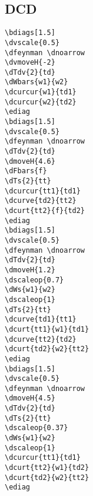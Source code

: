 \documentclass[a4paper]{article}
\begin{document}
\subsection{DCD}
\begin{minipage}[b]{0.55\linewidth}\centering
\begin{lstlisting}
\bdiags[1.5]
\dvscale{0.5}
\dfeynman \dnoarrow
\dvmoveH{-2}
\dTdv{2}{td}
\dWbars{w1}{w2}
\dcurcur{w1}{td1}
\dcurcur{w2}{td2}
\ediag
\bdiags[1.5]
\dvscale{0.5}
\dfeynman \dnoarrow
\dTdv{2}{td}
\dmoveH{4.6}
\dFbars{f}
\dTs{2}{tt}
\dcurcur{tt1}{td1}
\dcurve{td2}{tt2}
\dcurt{tt2}{f}{td2}
\ediag
\bdiags[1.5]
\dvscale{0.5}
\dfeynman \dnoarrow
\dTdv{2}{td}
\dmoveH{1.2}
\dscaleop{0.7}
\dWs{w1}{w2}
\dscaleop{1}
\dTs{2}{tt}
\dcurve{td1}{tt1}
\dcurt{tt1}{w1}{td1}
\dcurve{tt2}{td2}
\dcurt{td2}{w2}{tt2}
\ediag
\bdiags[1.5]
\dvscale{0.5}
\dfeynman \dnoarrow
\dmoveH{4.5}
\dTdv{2}{td}
\dTs{2}{tt}
\dscaleop{0.37}
\dWs{w1}{w2}
\dscaleop{1}
\dcurcur{tt1}{td1}
\dcurt{tt2}{w1}{td2}
\dcurt{td2}{w2}{tt2}
\ediag
\end{lstlisting}
\end{minipage}
\begin{minipage}[b]{0.45\linewidth}\centering
\bdiags[1.5]
\dfeynman \dnoarrow
{}
\ediag
\bdiags[1.5]
\dfeynman \dnoarrow
{}
\ediag
\bdiags[1.5]
\dfeynman \dnoarrow
{}
\ediag
\bdiags[1.5]
\dfeynman \dnoarrow
{}
\ediag
\end{minipage}
\end{document}
